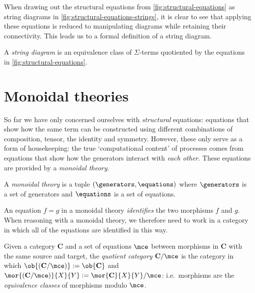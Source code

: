 When drawing out the structural equations from \cref{fig:structural-equations}
as string diagrams in \cref{fig:structural-equations-strings}, it is clear to
see that applying these equations is reduced to manipulating diagrams while
retaining their connectivity.
This leads us to a formal definition of a string diagram.

\begin{definition}
    A \emph{string diagram} is an equivalence class of \(\Sigma\)-terms
    quotiented by the equations in \cref{fig:structural-equations}.
\end{definition}

\section{Monoidal theories}

So far we have only concerned ourselves with \emph{structural} equations:
equations that show how the same term can be constructed using different
combinations of composition, tensor, the identity and symmetry.
However, these only serve as a form of housekeeping: the true `computational
content' of processes comes from equations that show how the generators interact
with \emph{each other}.
These equations are provided by a \emph{monoidal theory}.

\begin{definition}
    A \emph{monoidal theory} is a tuple \((\generators, \equations)\) where
    \(\generators\) is a set of generators and \(\equations\) is a set of
    equations.
\end{definition}

An equation \(f = g\) in a monoidal theory \emph{identifies} the two morphisms
\(f\) and \(g\).
When reasoning with a monoidal theory, we therefore need to work in a category
in which all of the equations are identified in this way.

\begin{definition}
    Given a category \(\mathbf{C}\) and a set of equations \(\mce\) between
    morphisms in \(\mathbf{C}\) with the same source and target, the
    \emph{quotient category} \(\mathbf{C} / \mce\) is the category in which
    \(\ob{(\mathbf{C} / \mce)} := \ob{\mathbf{C}}\) and \(
            \mor{(\mathbf{C} / \mce)}{X}{Y}
            :=
            \mor{\mathbf{C}}{X}{Y} / \mce
    \): i.e.\ morphisms are the \emph{equivalence classes} of morphisms
    modulo \(\mce\).
\end{definition}

